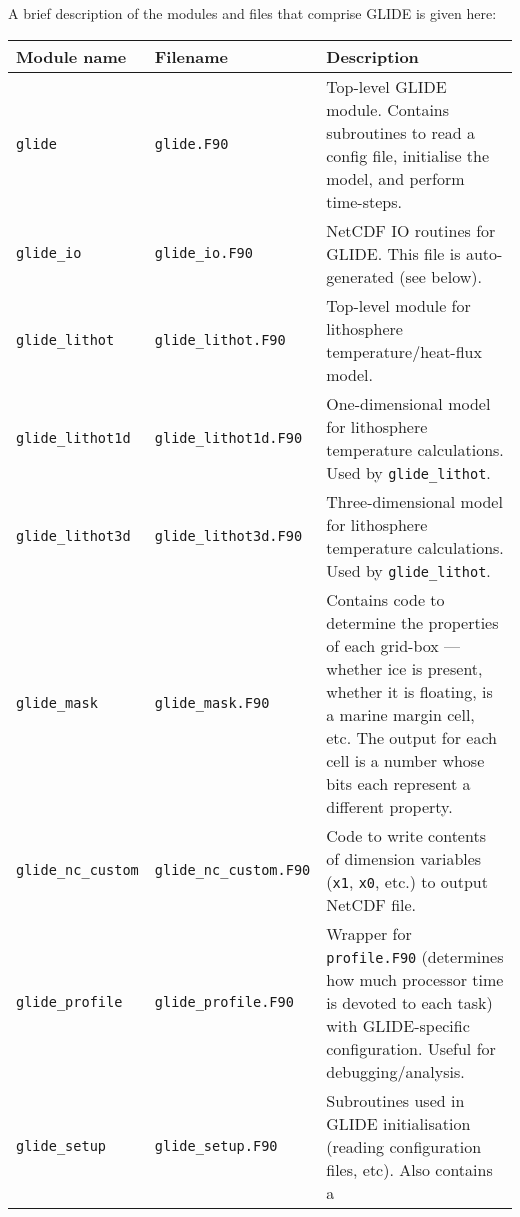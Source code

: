 A brief description of the modules and files that comprise GLIDE is given here:
\begin{center}
  \tablefirsthead{%
    \hline
  }
  \tablelasttail{\hline}
  \begin{supertabular}{|l|l|p{7cm}|}
    Module name & Filename & Description \\
    \hline
    \hline
    \texttt{glide} & \texttt{glide.F90} & Top-level GLIDE module. Contains
    subroutines to read a config file, initialise the model, and perform
    time-steps.\\
    \texttt{glide\_io} & \texttt{glide\_io.F90} & NetCDF IO routines for
    GLIDE. This file is auto-generated (see below).\\
    \texttt{glide\_lithot} & \texttt{glide\_lithot.F90} & Top-level module for
    lithosphere temperature/heat-flux model. \\
    \texttt{glide\_lithot1d} & \texttt{glide\_lithot1d.F90} & One-dimensional
    model for lithosphere temperature calculations. Used by \texttt{glide\_lithot}.\\
    \texttt{glide\_lithot3d} & \texttt{glide\_lithot3d.F90} & Three-dimensional
    model for lithosphere temperature calculations. Used by \texttt{glide\_lithot}.\\
    \texttt{glide\_mask} & \texttt{glide\_mask.F90} & Contains code to
    determine the properties of each grid-box --- whether ice is present,
    whether it is floating, is a marine margin cell, etc. The output for each
    cell is a number whose bits each represent a different property. \\
    \texttt{glide\_nc\_custom} & \texttt{glide\_nc\_custom.F90} & Code to
    write contents of dimension variables (\texttt{x1}, \texttt{x0}, etc.) to
    output NetCDF file.\\
    \texttt{glide\_profile} & \texttt{glide\_profile.F90} & Wrapper for
    \texttt{profile.F90} (determines how much processor time is devoted to
    each task) with GLIDE-specific configuration. Useful for
    debugging/analysis. \\
    \texttt{glide\_setup} & \texttt{glide\_setup.F90} & Subroutines used in
    GLIDE initialisation (reading configuration files, etc). Also contains a

\end{supertabular}
\end{center}
